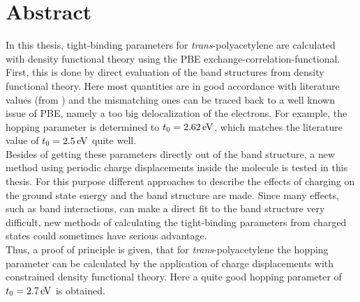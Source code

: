 \chapter*{Abstract}
In this thesis, tight-binding parameters for \emph{trans}-polyacetylene are calculated with density functional theory using the PBE exchange-correlation-functional. First, this is done by direct evaluation of the band structures from density functional theory. Here most quantities are in good accordance with literature values (from \cite{PhysRevLett.42.1698, doi:10.1021/cr990357p}) and the mismatching ones can be traced back to a well known issue of PBE, namely a too big delocalization of the electrons. For example, the hopping parameter is determined to $t_0 = \unit[2.62]{eV}$, which matches the literature value of $t_0 = \unit[2.5]{eV}$ quite well.\\
Besides of getting these parameters directly out of the band structure, a new method using periodic charge displacements inside the molecule is tested in this thesis. For this purpose different approaches to describe the effects of charging on the ground state energy and the band structure are made. Since many effects, such as band interactions, can make a direct fit to the band structure very difficult, new methods of calculating the tight-binding parameters from charged states could sometimes have serious advantage.\\
Thus, a proof of principle is given, that for \emph{trans}-polyacetylene the hopping parameter can be calculated by the application of charge displacements with constrained density functional theory. Here a quite good hopping parameter of $t_0 = \unit[2.7]{eV}$ is obtained.\\

